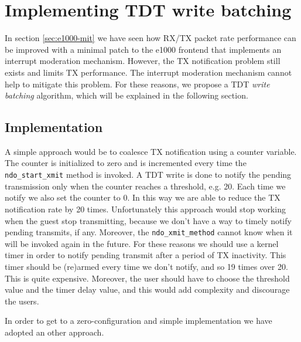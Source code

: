\section{Implementing TDT write batching}
In section \ref{sec:e1000-mit} we have seen how RX/TX packet rate performance can be improved with a minimal patch to the
e1000 frontend that implements an interrupt moderation mechanism.
However, the TX notification problem still exists and limits TX performance. The interrupt moderation mechanism cannot help to mitigate
this problem. For these reasons, we propose a TDT \emph{write batching} algorithm, which will be explained in the following section.


\subsection{Implementation}
A simple approach would be to coalesce TX notification using a counter variable. The counter is initialized to zero and is incremented 
every time the \texttt{ndo\_start\_xmit} method is invoked. A TDT write is done to notify the pending transmission only when the counter 
reaches a threshold, e.g. 20. Each time we notify we also set the counter to 0.
In this way we are able to reduce the TX notification rate by 20 times.
Unfortunately this approach would stop working when the guest stop transmitting, because we don't have a way to timely notify pending 
transmits, if any. Moreover, the \texttt{ndo\_xmit\_method} cannot know when it will be invoked again in the future. 
For these reasons we should use a kernel timer in order to notify pending transmit after a period of TX inactivity. This timer should be
(re)armed every time we don't notify, and so 19 times over 20. This is quite expensive.
Moreover, the user should have to choose the threshold value and the timer delay value, and this would add complexity and discourage the
users.

In order to get to a zero-configuration and simple implementation we have adopted an other approach.

\vspace{0.5cm}

